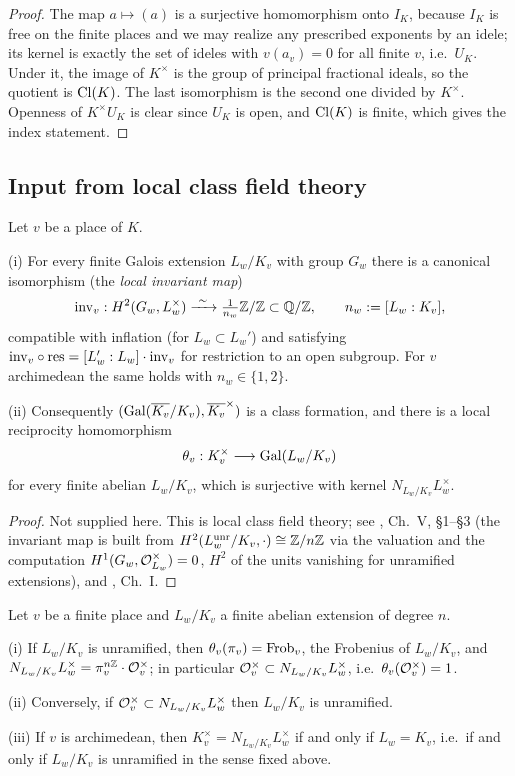 \begin{proof}
The map $a\mapsto(a)$ is a surjective homomorphism onto $I_K$, because $I_K$ is
free on the finite places and we may realize any prescribed exponents by an
idele; its kernel is exactly the set of ideles with $v(a_v)=0$ for all finite
$v$, i.e.~$U_K$.
Under it, the image of $K^\times$ is the group of principal fractional ideals, so
the quotient is ${\mathrm{Cl}}(K)$.
The last isomorphism is the second one divided by $K^\times$.
Openness of $K^\times U_K$ is clear since $U_K$ is open, and ${\mathrm{Cl}}(K)$ is finite,
which gives the index statement.
\end{proof}

\subsection{Input from local class field theory}

\begin{thm}
\label{local-reciprocity}
Let $v$ be a place of $K$.

{\rm(i)} For every finite Galois extension $L_w/K_v$ with group $G_w$ there is a
canonical isomorphism (the \emph{local invariant map})
$$\inv_v:H^2(G_w,L_w^\times)\xrightarrow{\ \sim\ }
\tfrac1{n_w}\BZ/\BZ\subset\BQ/\BZ,\qquad n_w:=[L_w:K_v],$$
compatible with inflation (for $L_w\subset L_w'$) and satisfying
${\mathrm{inv}}_v\circ\operatorname{res}=[L_w':L_w]\cdot{\mathrm{inv}}_v$ for restriction to an open subgroup.
For $v$ archimedean the same holds with $n_w\in\{1,2\}$.

{\rm(ii)} Consequently $({\mathrm{Gal}}(\overline{K_v}/K_v),\overline{K_v}^\times)$ is a class
formation, and there is a local reciprocity homomorphism
$$\theta_v:K_v^\times\longrightarrow{\mathrm{Gal}}(L_w/K_v)$$
for every finite abelian $L_w/K_v$, which is surjective with kernel
$N_{L_w/K_v}L_w^\times$.
\end{thm}

\begin{proof}
Not supplied here. This is local class field theory; see \cite{Neu99},
Ch.~V, \S1--\S3 (the invariant map is built from
$H^2(L_w^{\mathrm{unr}}/K_v,\cdot)\cong{\mathbb {Z}}/n{\mathbb {Z}}$ via the valuation and the
computation $H^1(G_w,{\mathcal {O}}_{L_w}^\times)=0$, $H^2$ of the units vanishing for
unramified extensions), and \cite{Mil20}, Ch.~I.
\end{proof}

\begin{prop}
\label{local-unramified-reciprocity}
Let $v$ be a finite place and $L_w/K_v$ a finite abelian extension of degree $n$.

{\rm(i)} If $L_w/K_v$ is unramified, then $\theta_v(\pi_v)={\mathrm{Frob}}_v$, the
Frobenius of $L_w/K_v$, and
$N_{L_w/K_v}L_w^\times=\pi_v^{n{\mathbb {Z}}}\cdot{\mathcal {O}}_v^\times$; in particular
${\mathcal {O}}_v^\times\subset N_{L_w/K_v}L_w^\times$, i.e.~$\theta_v({\mathcal {O}}_v^\times)=1$.

{\rm(ii)} Conversely, if ${\mathcal {O}}_v^\times\subset N_{L_w/K_v}L_w^\times$ then
$L_w/K_v$ is unramified.

{\rm(iii)} If $v$ is archimedean, then $K_v^\times=N_{L_w/K_v}L_w^\times$ if and
only if $L_w=K_v$, i.e.~if and only if $L_w/K_v$ is unramified in the sense
fixed above.
\end{prop}

